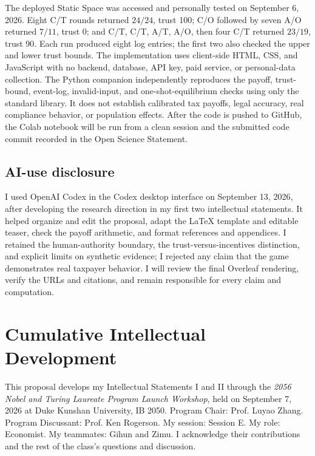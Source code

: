 The deployed Static Space was accessed and personally tested on September 6, 2026. Eight C/T rounds returned $24/24$, trust 100; C/O followed by seven A/O returned $7/11$, trust 0; and C/T, C/T, A/T, A/O, then four C/T returned $23/19$, trust 90. Each run produced eight log entries; the first two also checked the upper and lower trust bounds. The implementation uses client-side HTML, CSS, and JavaScript with no backend, database, API key, paid service, or personal-data collection. The Python companion independently reproduces the payoff, trust-bound, event-log, invalid-input, and one-shot-equilibrium checks using only the standard library. It does not establish calibrated tax payoffs, legal accuracy, real compliance behavior, or population effects. After the code is pushed to GitHub, the Colab notebook will be run from a clean session and the submitted code commit recorded in the Open Science Statement.
\subsection{AI-use disclosure}
I used OpenAI Codex in the Codex desktop interface on September 13, 2026, after developing the research direction in my first two intellectual statements. It helped organize and edit the proposal, adapt the LaTeX template and editable teaser, check the payoff arithmetic, and format references and appendices. I retained the human-authority boundary, the trust-versus-incentives distinction, and explicit limits on synthetic evidence; I rejected any claim that the game demonstrates real taxpayer behavior. I will review the final Overleaf rendering, verify the URLs and citations, and remain responsible for every claim and computation.

\section{Cumulative Intellectual Development}
This proposal develops my Intellectual Statements I and II through the \emph{2056 Nobel and Turing Laureate Program Launch Workshop}, held on September 7, 2026 at Duke Kunshan University, IB 2050. Program Chair: Prof. Luyao Zhang. Program Discussant: Prof. Ken Rogerson. My session: Session E. My role: Economist. My teammates: Gihun and Zimu. I acknowledge their contributions and the rest of the class's questions and discussion.

